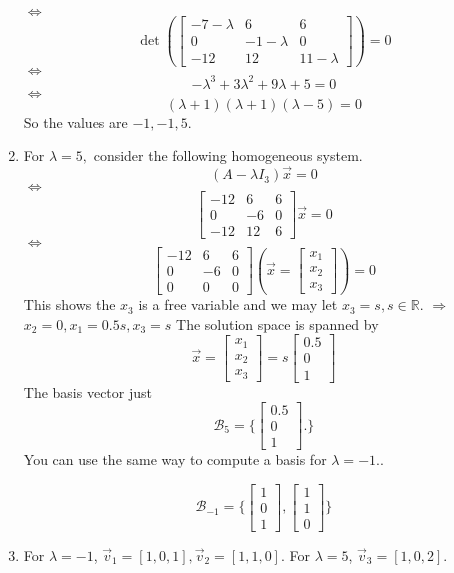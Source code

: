 \begin{SaveQuestion}
\begin{enumerate}
		$\Leftrightarrow$
		$$ \det(\begin{bmatrix} -7-\lambda & 6 & 6 \\ 0 & -1-\lambda & 0 \\ -12 & 12 & 11-\lambda \end{bmatrix})=0$$
		$\Leftrightarrow$
		$$-{\lambda}^3+3{\lambda}^2+9{\lambda}+5=0$$
		$\Leftrightarrow$
		$$(\lambda+1)(\lambda+1)(\lambda-5)=0$$
		So the values are $-1,-1,5$.
        \item For $\lambda=5,$ consider the following homogeneous system.
		$$ (A-\lambda I_3)\vec{x}=0 $$
		$\Leftrightarrow$
		$$\begin{bmatrix} -12 & 6 & 6 \\ 0 & -6 & 0 \\ -12 & 12 & 6 \end{bmatrix}\vec{x}=0$$
		$\Leftrightarrow$
		$$\begin{bmatrix} -12 & 6 & 6 \\ 0 & -6 & 0 \\ 0 & 0 & 0 \end{bmatrix}(\vec{x}=\begin{bmatrix} x_1  \\ x_2 \\ x_3 \end{bmatrix})=0$$
		This shows the $x_3$ is a free variable and we may let $x_3=s,s\in \mathbb{R}.$
		$\Rightarrow$
		$x_2=0,x_1=0.5s,x_3=s$ The solution space is spanned by 
		$$\vec{x}=\begin{bmatrix} x_1  \\ x_2 \\ x_3 \end{bmatrix}=s\begin{bmatrix} 0.5  \\ 0 \\ 1 \end{bmatrix} $$
		The basis vector just 
		$$\mathcal{B}_{5}=\{\begin{bmatrix} 0.5  \\ 0 \\ 1 \end{bmatrix} .\}$$
		You can use the same way to compute a basis for $\lambda=-1.$. 
		
			$$\mathcal{B}_{-1}=\{\begin{bmatrix} 1  \\ 0 \\ 1 \end{bmatrix} , \begin{bmatrix} 1  \\ 1 \\ 0 \end{bmatrix}\}$$
        \item For $\lambda=-1$,  $\vec{v}_1=[1 ,0, 1] ,\vec{v}_2=[1 ,1 ,0].$
		For $\lambda=5$, $\vec{v}_3=[1, 0, 2] .$
		

\end{enumerate}
\end{SaveQuestion}
